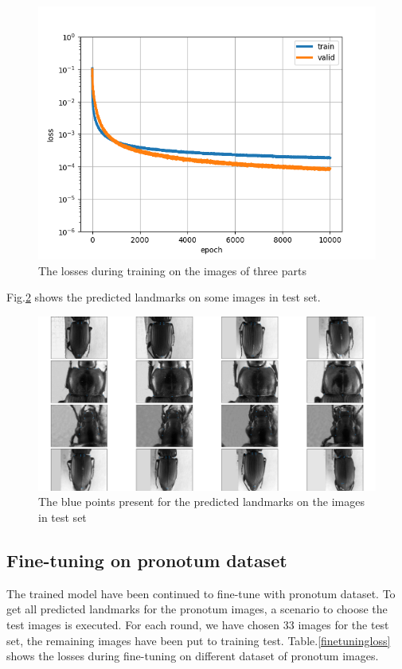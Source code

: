 \documentclass[12pt,a4paper]{article}
\begin{document}
\begin{figure}[h!]
	\centering
	\includegraphics[scale=0.6]{images/all_parts_10000epochs}
	\caption{The losses during training on the images of three parts}
	\label{figlossallparts}
\end{figure}

Fig.\ref{figtestallparts} shows the predicted landmarks on some images in test set.
\begin{figure}[h!]
	\centering
	\includegraphics[scale=0.53]{images/all_parts_10000epochs_test}
	\caption{The blue points present for the predicted landmarks on the images in test set}
	\label{figtestallparts}
\end{figure}
\subsection{Fine-tuning on pronotum dataset}
The trained model have been continued to fine-tune \cite{yosinski2014transferable} with pronotum dataset. To get all predicted landmarks for the pronotum images, a scenario to choose the test images is executed. For each round, we have chosen 33 images for the test set, the remaining images have been put to training test. Table.\ref{finetuningloss} shows the losses during fine-tuning on different dataset of pronotum images.
\end{document}
